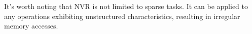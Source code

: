 \par It's worth noting that NVR is not limited to sparse tasks. %
It can be applied to any operations exhibiting unstructured characteristics, resulting in irregular memory accesses.




